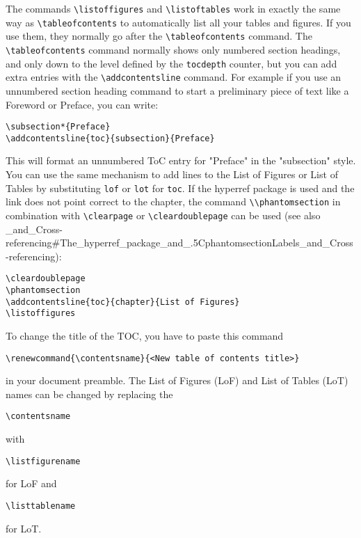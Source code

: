 The commands \lstinline{\listoffigures} and \lstinline{\listoftables} work in
exactly the same way as \lstinline{\tableofcontents} to automatically list all
your tables and figures. If you use them, they normally go after the
\lstinline{\tableofcontents} command. The \lstinline{\tableofcontents} command
normally shows only numbered section headings, and only down to the level
defined by the \lstinline{tocdepth} counter, but you can add extra entries with
the \lstinline{\addcontentsline} command. For example if you use an unnumbered
section heading command to start a preliminary piece of text like a Foreword or
Preface, you can write:
\begin{lstlisting}
\subsection*{Preface}
\addcontentsline{toc}{subsection}{Preface}
\end{lstlisting}

This will format an unnumbered ToC entry for "Preface" in the "subsection"
style. You can use the same mechanism to add lines to the List of Figures or
List of Tables by substituting \texttt{lof} or \texttt{lot} for \texttt{toc}.
If the hyperref package is used and the link does not point correct to the
chapter, the command \lstinline{\\phantomsection} in combination with
\lstinline{\clearpage} or \lstinline{\cleardoublepage} can be used (see also
\_and\_Cross-referencing#The\_hyperref\_package\_and\_.5CphantomsectionLabels\_and\_Cross-referencing):
\begin{lstlisting}
\cleardoublepage
\phantomsection
\addcontentsline{toc}{chapter}{List of Figures}
\listoffigures
\end{lstlisting}

To change the title of the TOC, you have to paste this command
\begin{lstlisting}
\renewcommand{\contentsname}{<New table of contents title>}
\end{lstlisting}

in your document preamble.  The List of Figures (LoF) and List of Tables (LoT)
names can be changed by replacing the 
\begin{lstlisting}
\contentsname
\end{lstlisting}
with 
\begin{lstlisting}
\listfigurename
\end{lstlisting}
for LoF and 
\begin{lstlisting}
\listtablename
\end{lstlisting}
for LoT.

